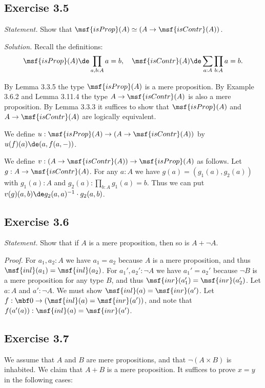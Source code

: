 \documentclass[12pt]{article}
\begin{document}

\subsection{Exercise 3.5}

\emph{Statement.} Show that $\msf{isProp}(A)\simeq(A\to\msf{isContr}(A))$. 

\nn\emph{Solution.} Recall the definitions: 
$$
\msf{isProp}(A)\de\prod_{a,b:A}a=b,\quad\msf{isContr}(A)\de\sum_{a:A}\prod_{b:A}a=b.
$$

By Lemma 3.3.5 the type $\msf{isProp}(A)$ is a mere proposition. By Example 3.6.2 and Lemma 3.11.4 the type $A\to\msf{isContr}(A)$ is also a mere proposition. By Lemma 3.3.3 it suffices to show that $\msf{isProp}(A)$ and $A\to\msf{isContr}(A)$ are logically equivalent. 

We define $u:\msf{isProp}(A)\to(A\to\msf{isContr}(A))$ by $u(f)(a)\de(a,f(a,-))$. 

We define $v:(A\to\msf{isContr}(A))\to\msf{isProp}(A)$ as follows. Let $g:A\to\msf{isContr}(A)$. For any $a:A$ we have $g(a)=(g_1(a),g_2(a))$ with $g_1(a):A$ and $g_2(a):\prod_{b:A}g_1(a)=b$. Thus we can put $v(g)(a,b)\de g_2(a,a)^{-1}\cdot g_2(a,b)$.



\subsection{Exercise 3.6}

\emph{Statement.} Show that if $A$ is a mere proposition, then so is $A+\neg A$.

\nn\emph{Proof.} For $a_1,a_2:A$ we have $a_1=a_2$ because $A$ is a mere proposition, and thus $\msf{inl}(a_1)=\msf{inl}(a_2)$. For $a_1',a_2':\neg A$ we have $a_1'=a_2'$ because $\neg B$ is a mere proposition for any type $B$, and thus $\msf{inr}(a_1')=\msf{inr}(a_2')$. Let $a:A$ and $a':\neg A$. We must show $\msf{inl}(a)=\msf{inr}(a')$. Let $f:\mbf0\to(\msf{inl}(a)=\msf{inr}(a'))$, and note that $f(a'(a)):\msf{inl}(a)=\msf{inr}(a')$.


\subsection{Exercise 3.7}

We assume that $A$ and $B$ are mere propositions, and that $\neg(A\times B)$ is inhabited. We claim that $A+B$ is a mere proposition. It suffices to prove $x=y$ in the following cases:
\end{document}
